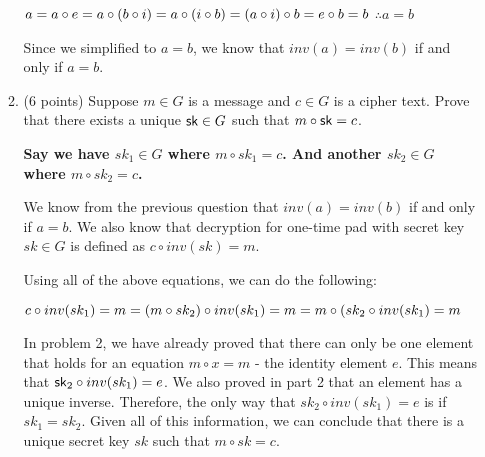 \documentclass[11pt]{article}
\begin{document}
\begin{enumerate}
\begin{enumerate}
{      $a = a\circ e \newline
      = a\circ (b\circ i) \newline
      = a\circ (i\circ b) \newline
      = (a\circ i)\circ b \newline
      = e\circ b \newline
      = b$ \newline
      $\therefore a=b$ \newline

      Since we simplified to $a=b$, we know that $inv(a)=inv(b)$ if and only if $a=b$.
  }
     \newpage
  
  \item (6 points) Suppose $m\in G $ is a message and $c\in G$ is a cipher text. 
    Prove that there exists a unique $\mathsf{sk}\in G$ such that $m\circ \mathsf{sk} = c$.  \newline
  {\bfseries
      \newline
      \newline
      Say we have $sk_1\in G$ where $m\circ sk_1 = c$. \newline
      And another $sk_2\in G$ where $m\circ sk_2 = c$. \newline
      \newline

      We know from the previous question that $inv(a)=inv(b)$ if and only if $a=b$. \newline
      We also know that decryption for one-time pad with secret key $sk\in G$ is defined as $c\circ inv(sk) = m$. \newline

      Using all of the above equations, we can do the following: \newline

      $c \circ inv(sk_1) = m \newline
      = (m\circ sk_2) \circ inv(sk_1) = m \newline
      = m \circ (sk_2 \circ inv(sk_1) = m$ \newline
      
      In problem 2, we have already proved that there can only be one element that holds for an equation $m\circ x = m$ - the identity element $e$. This means that $\mathsf{sk}_2\circ inv(sk_1) = e$. We also proved in part 2 that an element has a unique inverse. Therefore, the only way that $sk_2\circ inv(sk_1) = e$ is if $sk_1=sk_2$.
      Given all of this information, we can conclude that there is a unique secret key $sk$ such that $m\circ sk = c$.
  }
     \newpage
   \newpage
  \end{enumerate}
  

\end{enumerate}
\end{document}
